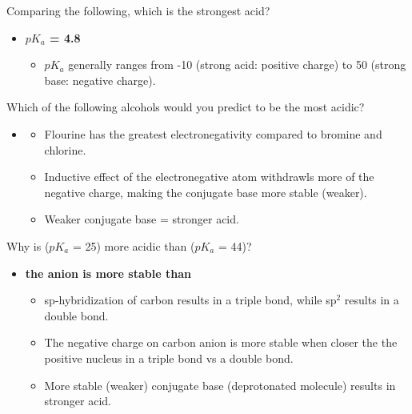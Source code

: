 \documentclass[12pt,a4paper]{article}
\begin{document}
\begin{enumerate}
    {\color{G-Moon}\item Comparing the following, which is the strongest acid?}
        \begin{itemize}
            \item {\color{o-Sun}\textbf{ \(pK_a\) = 4.8}}
                \begin{itemize}
                    \item \(pK_a\) generally ranges from {\color{pos}-10 (strong acid: positive charge)} to {\color{neg}50 (strong base: negative charge)}.
                \end{itemize}
        \end{itemize}
    {\color{G-Moon}\item Which of the following alcohols would you predict to be the most acidic?}
        \begin{itemize}
            \item {\color{o-Sun}\textbf{}}
                \begin{itemize}
                    \item Flourine has the greatest electronegativity compared to bromine and chlorine.
                    \item Inductive effect of the electronegative atom withdrawls more of the negative charge, making the conjugate base more stable (weaker).
                    \item Weaker conjugate base = stronger acid.
                \end{itemize}
        \end{itemize}
    {\color{G-Moon}\item Why is  (\(pK_a\) = 25) more acidic than  (\(pK_a\) = 44)?}
        \begin{itemize}
            \item {\color{o-Sun}\textbf{the  anion is more stable than }}
                \begin{itemize}
                    \item sp-hybridization of carbon results in a triple bond, while sp\(^{2}\) results in a double bond.
                    \item The negative charge on carbon anion is more stable when closer the the positive nucleus in a triple bond vs a double bond.
                    \item More stable (weaker) conjugate base (deprotonated molecule) results in stronger acid. 

\end{itemize}
\end{itemize}
\end{enumerate}
\end{document}
